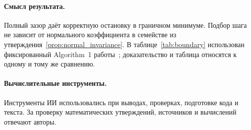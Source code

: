 \paragraph{Смысл результата.}
Полный зазор даёт корректную остановку в граничном минимуме.
Подбор шага не зависит от нормального коэффициента в семействе из
утверждения~\ref{prop:normal_invariance}. В таблице~\ref{tab:boundary}
использован фиксированный Algorithm~1 работы~\cite{vyguzov};
доказательство и таблица относятся к одному и тому же сравнению.

\paragraph{Вычислительные инструменты.}
Инструменты ИИ использовались при выводах, проверках, подготовке кода
и текста. За проверку математических утверждений, источников и
вычислений отвечают авторы.
